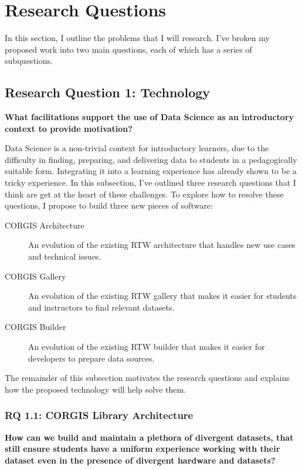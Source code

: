 \section{Research Questions}

In this section, I outline the problems that I will research. I've broken my proposed work into two main questions, each of which has a series of subquestions.

\subsection{Research Question 1: Technology}

\textbf{What facilitations support the use of Data Science as an introductory context to provide motivation?}

	Data Science is a non-trivial context for introductory learners, due to the difficulty in finding, preparing, and delivering data to students in a pedagogically suitable form.
    Integrating it into a learning experience has already shown to be a tricky experience.
    In this subsection, I've outlined three research questions that I think are get at the heart of these challenges. To explore how to resolve these questions, I propose to build three new pieces of software:
    \begin{description}
    	\item[CORGIS Architecture] An evolution of the existing RTW architecture that handles new use cases and technical issues.
        \item[CORGIS Gallery] An evolution of the existing RTW gallery that makes it easier for students and instructors to find relevant datasets.
        \item[CORGIS Builder] An evolution of the existing RTW builder that makes it easier for developers to prepare data sources.
    \end{description}
    
    The remainder of this subsection motivates the research questions and explains how the proposed technology will help solve them.
    
\subsubsection{RQ 1.1: CORGIS Library Architecture}

\textbf{How can we build and maintain a plethora of divergent datasets, that still ensure students have a uniform experience working with their dataset even in the presence of divergent hardware and datasets?}

